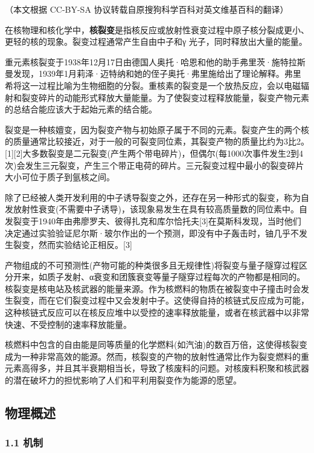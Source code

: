 
（本文根据 CC-BY-SA 协议转载自原搜狗科学百科对英文维基百科的翻译）

在核物理和核化学中，\textbf{核裂变}是指核反应或放射性衰变过程中原子核分裂成更小、更轻的核的现象。裂变过程通常产生自由中子和γ 光子，同时释放出大量的能量。

重元素核裂变于1938年12月17日由德国人奥托·哈恩和他的助手弗里茨·施特拉斯曼发现，1939年1月莉泽·迈特纳和她的侄子奥托·弗里施给出了理论解释。弗里希将这一过程比喻为生物细胞的分裂。重核素的裂变是一个放热反应，会以电磁辐射和裂变碎片的动能形式释放大量能量。为了使裂变过程释放能量，裂变产物元素的总结合能应该大于起始元素的结合能。

裂变是一种核嬗变，因为裂变产物与初始原子属于不同的元素。裂变产生的两个核的质量通常比较接近，对于一般的可裂变同位素，其裂变产物的质量比约为3比2。[1][2]大多数裂变是二元裂变(产生两个带电碎片)，但偶尔(每1000次事件发生2到4次)会发生三元裂变，产生三个带正电荷的碎片。三元裂变过程中最小的裂变碎片大小可位于质子到氩核之间。

除了已经被人类开发利用的中子诱导裂变之外，还存在另一种形式的裂变，称为自发放射性衰变(不需要中子诱导)，该现象易发生在具有较高质量数的同位素中。自发裂变于1940年由弗廖罗夫、彼得扎克和库尔恰托夫[3]在莫斯科发现，当时他们决定通过实验验证尼尔斯·玻尔作出的一个预测，即没有中子轰击时，铀几乎不发生裂变，然而实验结论正相反。[3]

产物组成的不可预测性(产物可能的种类很多且无规律性)将裂变与量子隧穿过程区分开来，如质子发射、α衰变和团簇衰变等量子隧穿过程每次的产物都是相同的。核裂变是核电站及核武器的能量来源。作为核燃料的物质在被裂变中子撞击时会发生裂变，而在它们裂变过程中又会发射中子。这使得自持的核链式反应成为可能，这种核链式反应可以在核反应堆中以受控的速率释放能量，或者在核武器中以非常快速、不受控制的速率释放能量。

核燃料中包含的自由能是同等质量的化学燃料(如汽油)的数百万倍，这使得核裂变成为一种非常高效的能源。然而，核裂变的产物的放射性通常比作为裂变燃料的重元素高得多，并且其半衰期相当长，导致了核废料的问题。对核废料积聚和核武器的潜在破坏力的担忧影响了人们和平利用裂变作为能源的愿望。

\subsection{ 物理概述}
\subsubsection{1.1 机制}

